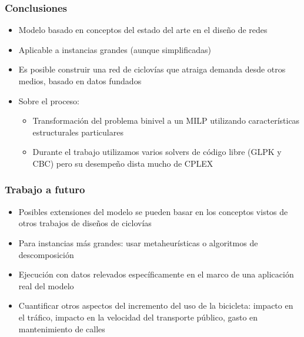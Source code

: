 \documentclass[aspectratio=43, 10pt]{beamer}
\begin{document}
\begin{frame}
    \frametitle{Conclusiones}

    \begin{itemize}
        \item{Modelo basado en conceptos del estado del arte en el diseño de redes}
        \item{Aplicable a instancias grandes (aunque simplificadas)}
        \item{Es posible construir una red de ciclovías que atraiga demanda desde otros medios, basado en datos fundados}
        \item{Sobre el proceso:
            \begin{itemize}
                \item{Transformación del problema binivel a un MILP utilizando características estructurales particulares}
                \item{Durante el trabajo utilizamos varios solvers de código libre (GLPK y CBC) pero su desempeño dista mucho de CPLEX}
            \end{itemize}
        }
    \end{itemize}

\end{frame}

\begin{frame}
    \frametitle{Trabajo a futuro}

    \begin{itemize}
        \item{Posibles extensiones del modelo se pueden basar en los conceptos vistos de otros trabajos de diseños de ciclovías}
        \item{Para instancias más grandes: usar metaheurísticas o algoritmos de descomposición}
        \item{Ejecución con datos relevados específicamente en el marco de una aplicación real del modelo}
        \item{Cuantificar otros aspectos del incremento del uso de la bicicleta:
            impacto en el tráfico,
            impacto en la velocidad del transporte público,
            gasto en mantenimiento de calles
        }
    \end{itemize}
\end{frame}
\end{document}
